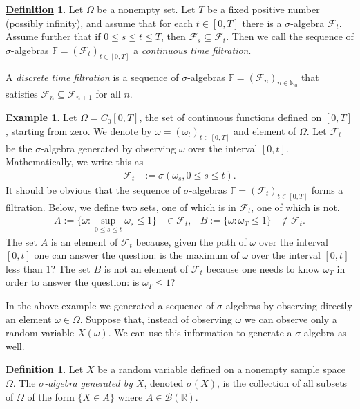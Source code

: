 \documentclass[12pt]{book}
\numberwithin{equation}{chapter}
\theoremstyle{plain}
\numberwithin{theorem}{section}
\theoremstyle{definition}
\newtheorem{definition}[theorem]{\underline{Definition}}
\newtheorem{example}[theorem]{\underline{Example}}
\numberwithin{exercise}{chapter}
\newcommand{\<}{\langle}
\renewcommand{\>}{\rangle}
\renewcommand{\(}{\left(}
\renewcommand{\)}{\right)}
\renewcommand{\[}{\left[}
\renewcommand{\]}{\right]}
\newcommand\Fb{\mathds{F}}
\newcommand\Rb{\mathds{R}}
\newcommand\Nb{\mathds{N}}
\newcommand\Bc{\mathscr{B}}
\newcommand\Fc{\mathscr{F}}
\newcommand\om{\omega}
\newcommand\Om{\Omega}
\newcommand\sig{\sigma}
\begin{document}
\begin{definition}
\label{def:filtration}
Let $\Om$ be a nonempty set. Let $T $ be a fixed positive number (possibly infinity), and assume that for each $t \in [0,T]$ there is a $\sig$-algebra $\Fc_t$.  Assume further
that if $0 \leq s \leq  t \leq T$, then $\Fc_s \subseteq \Fc_t$. Then we call the sequence of $\sig$-algebras $\Fb = (\Fc_t)_{t \in [0,T]}$ a \emph{continuous time filtration}.
\end{definition}

\noindent
A \emph{discrete time filtration} is a sequence of $\sig$-algebras $\Fb=(\Fc_n)_{n \in \Nb_0}$ that satisfies $\Fc_n \subseteq \Fc_{n+1}$ for all $n$.

\begin{example}
Let $\Om = C_0[0,T]$, the set of continuous functions defined on $[0,T]$, starting from zero.  We denote by $\om = (\om_t)_{t \in [0,T]}$ and element of $\Om$.  Let $\Fc_t$ be the $\sig$-algebra generated by observing $\om$ over the interval $[0,t]$.  Mathematically, we write this as
\begin{align}
\Fc_t
	&:= \sig( \om_s , 0 \leq s \leq t ) .
\end{align}
It should be obvious that the sequence of $\sig$-algebras $\Fb=(\Fc_t)_{t \in [0,T]}$ forms a filtration.
Below, we define two sets, one of which is in $\Fc_t$, one of which is not.
\begin{align}
A := \{ \om : \sup_{0 \leq s \leq t} \om_s \leq 1 \}
	&\in \Fc_t , &
B:= \{ \om : \om_T \leq 1 \}
	&\notin \Fc_t .
\end{align}
The set $A$ is an element of $\Fc_t$ because, given the path of $\om$ over the interval $[0,t]$ one can answer the question: is the maximum of $\om$ over the interval $[0,t]$ less than $1$?  The set $B$ is not an element of $\Fc_t$ because one needs to know $\om_T$ in order to answer the question: is $\om_T \leq 1$?
\end{example}

\noindent
In the above example we generated a sequence of $\sig$-algebras by observing directly an element $\om \in \Om$.  Suppose that, instead of observing $\om$ we can observe only a random variable $X(\om)$.  We can use this information to generate a $\sig$-algebra as well.

\begin{definition}
\label{def:sigma.X}
Let  $X$  be a random variable defined on a nonempty sample space  $\Om$.  The \emph{$\sig$-algebra generated by $X$},  denoted  $\sig(X)$, is the collection of all
subsets of $\Om$ of the form  $\{X \in A\}$ where $A \in \Bc(\Rb)$.
\end{definition}
\end{document}
